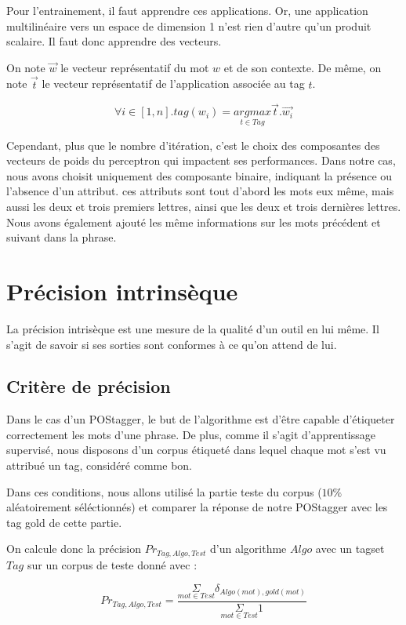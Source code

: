 \documentclass{article}
\begin{document}
Pour l'entrainement, il faut apprendre ces applications. Or, une application multilinéaire vers un espace de dimension 1 n'est rien d'autre qu'un produit scalaire. Il faut donc apprendre des vecteurs.

On note $\overrightarrow{w}$ le vecteur représentatif du mot $w$ et de son contexte. De même, on note $\overrightarrow{t}$ le vecteur représentatif de l'application associée au tag $t$.

$$\forall i \in [1,n] . tag(w_i) = \underset{t \in Tag}{argmax}\overrightarrow{t}.\overrightarrow{w_i}$$

Cependant, plus que le nombre d'itération, c'est le choix des composantes des vecteurs de poids du perceptron qui impactent ses performances. Dans notre cas, nous avons choisit uniquement des composante binaire, indiquant la présence ou l'absence d'un attribut. ces attributs sont tout d'abord les mots eux même, mais aussi les deux et trois premiers lettres, ainsi que les deux et trois dernières lettres. Nous avons également ajouté les même informations sur les mots précédent et suivant dans la phrase.


\section{Précision intrinsèque}

La précision intrisèque est une mesure de la qualité d'un outil en lui même. Il s'agit de savoir si ses sorties sont conformes à ce qu'on attend de lui.

\subsection{Critère de précision}

Dans le cas d'un POStagger, le but de l'algorithme est d'être capable d'étiqueter correctement les mots d'une phrase. De plus, comme il s'agit d'apprentissage supervisé, nous disposons d'un corpus étiqueté dans lequel chaque mot s'est vu attribué un tag, considéré comme bon.

Dans ces conditions, nous allons utilisé la partie teste du corpus ($10\%$ aléatoirement séléctionnés) et comparer la réponse de notre POStagger avec les tag gold de cette partie.

On calcule donc la précision $Pr_{Tag,Algo,Test}$ d'un algorithme $Algo$ avec un tagset $Tag$ sur un corpus de teste donné avec :

$$Pr_{Tag,Algo,Test} = \frac{\underset{mot \in Test}{\Sigma} \delta_{Algo(mot) , gold(mot)}}{\underset{mot \in Test}{\Sigma} 1}$$
\end{document}

